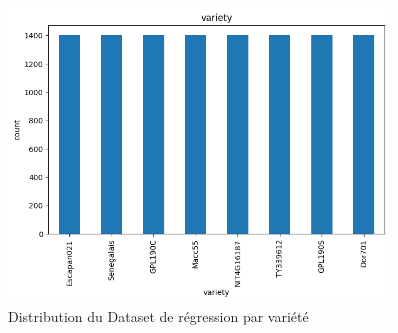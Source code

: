 \begin{figure}[H]
	\centering
	\includegraphics[width=0.9\textwidth]{figures/distrib_varietes.png}
	\caption{Distribution du Dataset de régression par variété}
	\label{fig:rv_dataset}
\end{figure}




